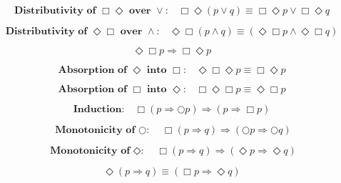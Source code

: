 \documentclass[fleqn, leqno]{article}
\newcommand{\Next}{\bigcirc}
\newcommand{\Event}{\Diamond}
\newcommand{\Always}{\Box}
\begin{document}
\begin{equation}\label{E:distAlwaysEventOr}
\textbf{Distributivity of $\Always\Event$ over $\lor$:}\quad \Always\Event(p \lor q) \equiv \Always\Event p \lor \Always\Event q
\end{equation}


\begin{equation}\label{E:distEventAlwaysAnd}
\textbf{Distributivity of $\Event\Always$ over $\land$:}\quad \Event\Always(p \land q) \equiv (\Event\Always p \land \Event\Always q)
\end{equation}


\begin{equation}\label{E:eventAlwaysImp}
\Event\Always p \Rightarrow \Always\Event p
\end{equation}



\begin{equation}\label{E:absEvent}
\textbf{Absorption of $\Event$ into $\Always$:}\quad \Event\Always\Event p \equiv \Always\Event p
\end{equation}



\begin{equation}\label{E:absAlways}
\textbf{Absorption of $\Always$ into $\Event$:}\quad \Always\Event\Always p \equiv \Event\Always p
\end{equation}



\begin{equation}\label{E:alwaysImpNext}
\textbf{Induction:}\quad \Always (p \Rightarrow \Next p) \Rightarrow (p \Rightarrow \Always p)
\end{equation}



\begin{equation}\label{E:alwaysImpNexts}
\textbf{Monotonicity of $\Next$:}\quad \Always (p \Rightarrow q) \Rightarrow (\Next p \Rightarrow \Next q)
\end{equation}



\begin{equation}\label{E:alwaysImpEvents}
\textbf{Monotonicity of $\Event$:}\quad \Always (p \Rightarrow q) \Rightarrow (\Event p \Rightarrow \Event q)
\end{equation}



\begin{equation}\label{E:eventImpAlways}
\Event (p \Rightarrow q) \equiv (\Always p \Rightarrow \Event q)
\end{equation}
\end{document}
